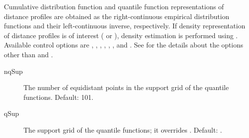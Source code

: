 \documentclass[a4paper]{book}
\begin{document}
%
\begin{Details}\relax
Cumulative distribution function and quantile function representations of 
distance profiles are obtained as the right-continuous empirical distribution functions 
and their left-continuous inverse, respectively. 
If density representation of distance profiles is of interest 
( or ), 
density estimation is performed using .
Available control options are , , , , 
, ,  and . 
See  for the details about the options 
other than  and .
\begin{description}

\item[nqSup] The number of equidistant points in the support grid of the quantile functions. 
Default: 101.
\item[qSup] The support grid of the quantile functions; it overrides . 
Default: .

\end{description}

\end{Details}
%
\end{document}
